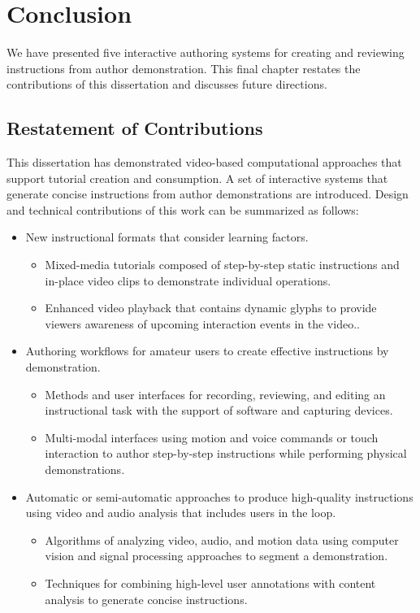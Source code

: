 \chapter{Conclusion}
\label{chapter_conclusion}

We have presented five interactive authoring systems for creating and reviewing instructions from author demonstration. This final chapter restates the contributions of this dissertation and discusses future directions.

\section{Restatement of Contributions}
This dissertation has demonstrated video-based computational approaches that support tutorial creation and consumption. A set of interactive systems that generate concise instructions from author demonstrations are introduced. Design and technical contributions of this work can be summarized as follows:

\begin{itemize}
  \item New instructional formats that consider learning factors.
    \begin{itemize}
      \item Mixed-media tutorials composed of step-by-step static instructions and in-place video clips to demonstrate individual operations.
      \item Enhanced video playback that contains dynamic glyphs to provide viewers awareness of upcoming interaction events in the video..
    \end{itemize}
  \item Authoring workflows for amateur users to create effective instructions by demonstration.
    \begin{itemize}
      \item Methods and user interfaces for recording, reviewing, and editing an instructional task with the support of software and capturing devices.
      \item Multi-modal interfaces using motion and voice commands or touch interaction to author step-by-step instructions while performing physical demonstrations.
    \end{itemize}
  \item Automatic or semi-automatic approaches to produce high-quality instructions using video and audio analysis that includes users in the loop.
    \begin{itemize}
      \item Algorithms of analyzing video, audio, and motion data using computer vision and signal processing approaches to segment a demonstration.
      \item Techniques for combining high-level user annotations with content analysis to generate concise instructions.
    \end{itemize}
\end{itemize}

